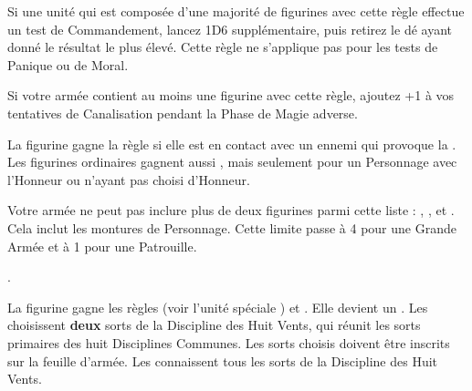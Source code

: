 \newcommand{\chillaurarule}{%
Les unités ennemies en contact avec au moins une figurine avec cette règle subissent des malus de -3 en Initiative et -1 en Force, jusqu'à un minimum de 1.
}










\startarmyspecialrules

\armyspecialruleentry{\martialdiscipline}

Si une unité qui est composée d'une majorité de figurines avec cette règle effectue un test de Commandement, lancez 1D6 supplémentaire, puis retirez le dé ayant donné le résultat le plus élevé. Cette règle ne s'applique pas pour les tests de Panique ou de Moral.

\armyspecialruleentry{\masterofbalance}

Si votre armée contient au moins une figurine avec cette règle, ajoutez +1 à vos tentatives de Canalisation pendant la Phase de Magie adverse.

\armyspecialruleentry{\valiant}

La figurine gagne la règle \stubborn{} si elle est en contact avec un ennemi qui provoque la \fear{}. Les figurines ordinaires gagnent aussi \bodyguard{\highprince{}, \commander{}}, mais seulement pour un Personnage avec l’Honneur \royalhuntsman{} ou n'ayant pas choisi d'Honneur.

\armyspecialruleentry{\lastoftheirkind}

Votre armée ne peut pas inclure plus de deux figurines parmi cette liste : \youngdragons{}, \dragons{}, \firephoenixes{} et \frostphoenixes{}. Cela inclut les montures de Personnage. Cette limite passe à 4 pour une Grande Armée et à 1 pour une Patrouille.

\closearmyspecialrules








\newpage
{}

\vspace{0.5cm}

\hfill
{}\oneofakind{}.\vspace{5pt}

La figurine gagne les règles \swordsworn{} (voir l'unité spéciale \swordmasters{}) et \masterofbalance{}. Elle devient un \textbf{}. Les \commanders{} choisissent \textbf{deux} sorts de la Discipline des Huit Vents, qui réunit les sorts primaires des huit Disciplines Communes. Les sorts choisis doivent être inscrits sur la feuille d'armée. Les \highprinces{} connaissent tous les sorts de la Discipline des Huit Vents.

